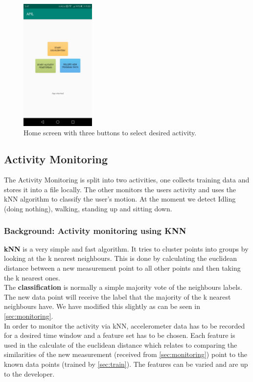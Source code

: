 \documentclass[12pt]{article}
\begin{document}
\begin{figure}
	\centering
	\includegraphics[width=140px]{images/main.jpeg}
	\caption{Home screen with three buttons to select desired activity.}
	\label{fig:main}
\end{figure}

\subsection{Activity Monitoring}\label{sec:activitymonitoring}
The Activity Monitoring is split into two activities, one collects training data and stores it into a file locally. The other monitors the users activity and uses the kNN algorithm to classify the user's motion. At the moment we detect Idling (doing nothing), walking, standing up and sitting down.

\subsubsection{Background: Activity monitoring using KNN}\label{sec:knnbackground}
\textbf{kNN} is a very simple and fast algorithm. It tries to cluster points into groups by looking at the k nearest neighbours. This is done by calculating the euclidean distance between a new measurement point to all other points and then taking the k nearest ones. 
\\
The \textbf{classification} is normally a simple majority vote of the neighbours labels. The new data point will receive the label that the majority of the k nearest neighbours have. We have modified this slightly as can be seen in \ref{sec:monitoring}.
\\
In order to monitor the activity via kNN, accelerometer data has to be recorded for a desired time window and a feature set has to be chosen. Each feature is used in the calculate of the euclidean distance which relates to comparing the similarities of the new measurement (received from \ref{sec:monitoring}) point to the known data points (trained by \ref{sec:train}). The features can be varied and are up to the developer.
\end{document}
